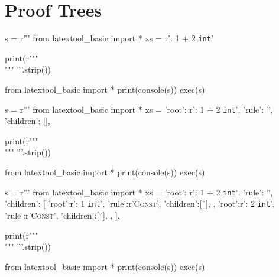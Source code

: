 \section{Proof Trees}


\begin{python}
s = r'''
from latextool_basic import *
xs = r'{\Gamma: 1 + 2 \vdash \texttt{int}}'
     
print(r"""
\[
\]
""" %
'''.strip())

from latextool_basic import *
print(console(s))
exec(s)
\end{python}



\begin{python}
s = r'''
from latextool_basic import *
xs = {'root': r'{\Gamma: 1 + 2 \vdash \texttt{int}}',
      'rule': '',
      'children': [],
     }
     
print(r"""
\[
\]
""" %
'''.strip())

from latextool_basic import *
print(console(s))
exec(s)
\end{python}





\newpage
\begin{python}
s = r'''
from latextool_basic import *
xs = {'root': r'{\Gamma: 1 + 2 \vdash \texttt{int}}',
      'rule': '',
      'children': [
        {'root':r'\Gamma: 1 \vdash \texttt{int}',
         'rule':r'\textsc{Const}',
         'children':[''],
        },
        {'root':r'\Gamma: 2 \vdash \texttt{int}',
         'rule':r'\textsc{Const}',
         'children':[''],
        },
      ],
     }
     
print(r"""
\[
\]
""" %
'''.strip())

from latextool_basic import *
print(console(s))
exec(s)
\end{python}
